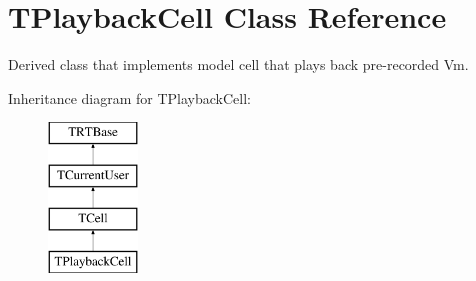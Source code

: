 \hypertarget{class_t_playback_cell}{\section{T\+Playback\+Cell Class Reference}
\label{class_t_playback_cell}
}


Derived class that implements model cell that plays back pre-\/recorded Vm.  


Inheritance diagram for T\+Playback\+Cell\+:\begin{figure}[H]
\begin{center}
\leavevmode
\includegraphics[height=4.000000cm]{class_t_playback_cell}
\end{center}
\end{figure}
